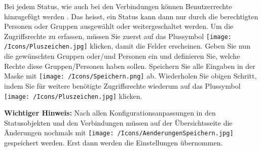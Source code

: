 \vspace{\baselineskip}

Bei jedem Status, wie auch bei den Verbindungen können Benutzerrechte hinzugefügt werden . Das heisst, ein Status kann dann nur durch die berechtigten Personen oder Gruppen ausgewählt oder weitergeschaltet werden. Um die Zugriffsrechte zu erfassen, müssen Sie zuerst auf das Plussymbol \texttt{[image: /Icons/Pluszeichen.jpg]}  klicken, damit die Felder erscheinen. Geben Sie nun die gewünschten Gruppen oder/und Personen ein und definieren Sie, welche Rechte diese Gruppen/Personen haben sollen. Speichern Sie alle Eingaben in der Maske mit \texttt{[image: /Icons/Speichern.png]}  ab. Wiederholen Sie obigen Schritt, indem Sie für weitere benötigte Zugriffsrechte wiederum auf das Plussymbol \texttt{[image: /Icons/Pluszeichen.jpg]}  klicken.

\vspace{\baselineskip}

\begin{mdframed}[backgroundcolor=orange!30] 
\textbf{Wichtiger Hinweis:} Nach allen Konfigurationsanpassungen in den Statusobjekten und den Verbindungen müssen auf der Übersichtsseite die Änderungen nochmals mit \texttt{[image: /Icons/AenderungenSpeichern.jpg]} gespeichert werden. Erst dann werden die Einstellungen übernommen.
\end{mdframed}


